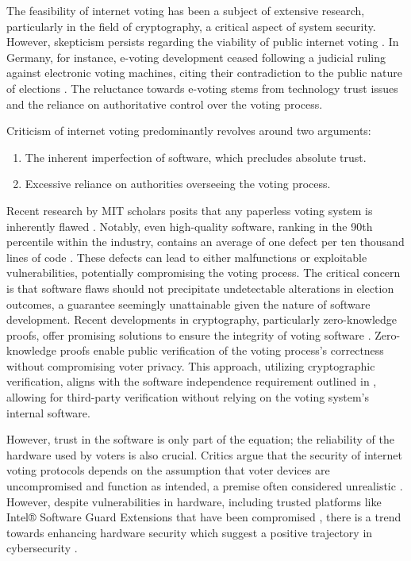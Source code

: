 \documentclass[runningheads]{llncs}
\begin{document}
The feasibility of internet voting has been a subject of extensive research, particularly in the field of cryptography, a critical aspect of system security. However, skepticism persists regarding the viability of public internet voting \cite{parkGoingBadWorse2021, mearianWhyBlockchainbasedVoting2019, shanklandNoBlockchainIsn2018, leeBlockchainbasedElectionsWould2018, schneierBlockchainVoting2020, schneierBlockchainTrust2019}. In Germany, for instance, e-voting development ceased following a judicial ruling against electronic voting machines, citing their contradiction to the public nature of elections \cite{ElectronicVotingCountry2023}. The reluctance towards e-voting stems from technology trust issues and the reliance on authoritative control over the voting process.

Criticism of internet voting predominantly revolves around two arguments:

\begin{enumerate}
\item The inherent imperfection of software, which precludes absolute trust.
\item Excessive reliance on authorities overseeing the voting process.
\end{enumerate}

Recent research by MIT scholars posits that any paperless voting system is inherently flawed \cite{parkGoingBadWorse2021}. Notably, even high-quality software, ranking in the 90th percentile within the industry, contains an average of one defect per ten thousand lines of code \cite{llaguno2017CoverityScan2017}. These defects can lead to either malfunctions or exploitable vulnerabilities, potentially compromising the voting process. The critical concern is that software flaws should not precipitate undetectable alterations in election outcomes, a guarantee seemingly unattainable given the nature of software development.
Recent developments in cryptography, particularly zero-knowledge proofs, offer promising solutions to ensure the integrity of voting software \cite{parnoPinocchioNearlyPractical2013}. Zero-knowledge proofs enable public verification of the voting process's correctness without compromising voter privacy. This approach, utilizing cryptographic verification, aligns with the software independence requirement outlined in \cite{parkGoingBadWorse2021}, allowing for third-party verification without relying on the voting system's internal software.

However, trust in the software is only part of the equation; the reliability of the hardware used by voters is also crucial. Critics argue that the security of internet voting protocols depends on the assumption that voter devices are uncompromised and function as intended, a premise often considered unrealistic \cite{parkGoingBadWorse2021}. However, despite vulnerabilities in hardware, including trusted platforms like Intel® Software Guard Extensions \cite{mckeenIntelSoftwareGuard2016} that have been compromised \cite{goodinIntelSGXVulnerable2020, IntelSGXBroken2019, bulckForeshadowExtractingKeys}, there is a trend towards enhancing hardware security which suggest a positive trajectory in cybersecurity \cite{golombBelieveItCybersecurity2018}.
\end{document}
